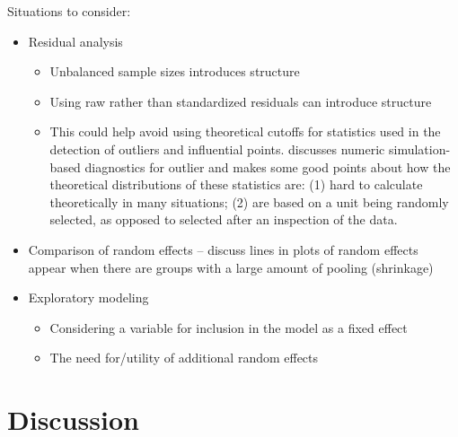 \documentclass{article} %
\begin{document}
Situations to consider:
\begin{itemize}
\item Residual analysis
	\begin{itemize}
	\item Unbalanced sample sizes introduces structure
	\item Using raw rather than standardized residuals can introduce structure
	\item This could help avoid using theoretical cutoffs for statistics used in the detection of outliers and influential points. \cite{Longford:2001wy} discusses numeric simulation-based diagnostics for outlier and makes some good points about how the theoretical distributions of these statistics are: (1) hard to calculate theoretically in many situations; (2) are based on a unit being randomly selected, as opposed to selected after an inspection of the data.
	\end{itemize}

\item Comparison of random effects -- \cite{Morrell:2000ve} discuss lines in plots of random effects appear when there are groups with a large amount of pooling (shrinkage)

\item Exploratory modeling
	\begin{itemize}
	\item Considering a variable for inclusion in the model as a fixed effect
	\item The need for/utility of additional random effects
	
	\end{itemize}


\end{itemize}

\section{Discussion}





\end{document}
